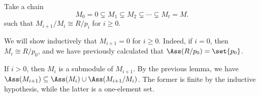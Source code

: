 Take a chain
\[ M_0 = 0 \subsetneq M_1 \subsetneq M_2 \subsetneq \cdots \subsetneq M_t = M. \]
such that $M_{i+1}/M_i \cong R/p_i$ for $i\geq 0$.

We will show inductively that $M_{i+1} = 0$ for $i \geq 0$. Indeed, if
$i = 0$, then $M_i \cong R/p_0$, and we have previously calculated that
$\Ass(R/p_0) = \set{p_0}$.

If $i > 0$, then $M_i$ is a submodule of $M_{i+1}$. By the previous lemma,
we have $\Ass(M_{i+1}) \subseteq \Ass(M_i) \cup \Ass(M_{i+1}/M_i)$. The former
is finite by the inductive hypothesis, while the latter is a one-element set.
